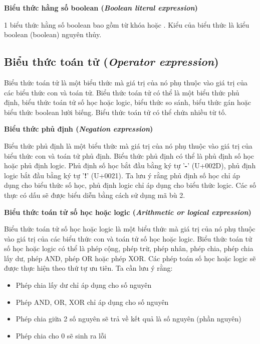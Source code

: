 \noindent\textbf{Biểu thức hằng số boolean (\textit{Boolean literal expression})}

1 biểu thức hằng số boolean bao gồm từ khóa  hoặc . Kiểu của biểu thức là kiểu boolean (boolean) nguyên thủy.

\subsection{Biểu thức toán tử (\textit{Operator expression})}

\regexopexpr

Biểu thức toán tử là một biểu thức mà giá trị của nó phụ thuộc vào giá trị của các biểu thức con và toán tử. Biểu thức toán tử có thể là một biểu thức phủ định, biểu thức toán tử số học hoặc logic, biểu thức so sánh, biểu thức gán hoặc biểu thức boolean lười biếng. Biểu thức toán tử có thể chứa nhiều từ tố.

\noindent\textbf{Biểu thức phủ định (\textit{Negation expression})}

\regexneexpr

Biểu thức phủ định là một biểu thức mà giá trị của nó phụ thuộc vào giá trị của biểu thức con và toán tử phủ định. Biểu thức phủ định có thể là phủ định số học hoặc phủ định logic. Phủ định số học bắt đầu bằng ký tự '\textbf{-}' (U+002D), phủ định logic bắt đầu bằng ký tự '\textbf{!}' (U+0021). Ta lưu ý rằng phủ định số học chỉ áp dụng cho biểu thức số học, phủ định logic chỉ áp dụng cho biểu thức logic. Các số thực có dấu sẽ được biểu diễn bằng cách sử dụng mã bù 2.

\noindent\textbf{Biểu thức toán tử số học hoặc logic (\textit{Arithmetic or logical expression})}

\regexarithlogicexpr

Biểu thức toán tử số học hoặc logic là một biểu thức mà giá trị của nó phụ thuộc vào giá trị của các biểu thức con và toán tử số học hoặc logic. Biểu thức toán tử số học hoặc logic có thể là phép cộng, phép trừ, phép nhân, phép chia, phép chia lấy dư, phép AND, phép OR hoặc phép XOR. Các phép toán số học hoặc logic sẽ được thực hiện theo thứ tự ưu tiên. Ta cần lưu ý rằng:

\begin{itemize}
    \item{Phép chia lấy dư chỉ áp dụng cho số nguyên}
    \item{Phép AND, OR, XOR chỉ áp dụng cho số nguyên}
    \item{Phép chia giữa 2 số nguyên sẽ trả về kết quả là số nguyên (phần nguyên)}
    \item{Phép chia cho 0 sẽ sinh ra lỗi}           
\end{itemize}

